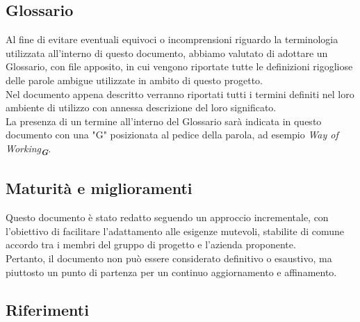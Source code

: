 \subsection{Glossario}
\label{sec:glossario}
Al fine di evitare eventuali equivoci o incomprensioni riguardo la terminologia utilizzata all’interno di questo documento, 
abbiamo valutato di adottare un Glossario, con file apposito, in cui
vengono riportate tutte le definizioni rigogliose delle parole ambigue utilizzate in ambito di
questo progetto.\\
Nel documento appena descritto verranno riportati tutti i termini definiti nel
loro ambiente di utilizzo con annessa descrizione del loro significato.\\
La presenza di un termine all'interno del Glossario sarà indicata in questo documento con una "G" posizionata al pedice della parola,
ad esempio \emph{Way of Working}\textsubscript{\textbf{\textit{G}}}.

\subsection{Maturità e miglioramenti}
Questo documento è stato redatto seguendo un approccio incrementale, con l'obiettivo di facilitare l'adattamento alle esigenze mutevoli, stabilite di comune accordo tra i membri del gruppo di progetto e l'azienda proponente.\\
Pertanto, il documento non può essere considerato definitivo o esaustivo, ma piuttosto un punto di partenza per un continuo aggiornamento e affinamento.

\subsection{Riferimenti}
\label{sec:riferimenti}

